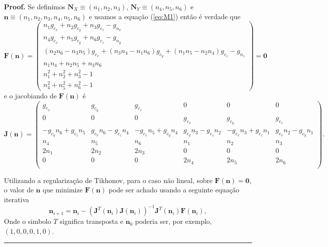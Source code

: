 \documentclass[a4paper,10pt]{report}
\newenvironment{proof}[1][Proof]{\textbf{#1.} }{\ \rule{0.5em}{0.5em}}
\begin{document}
\begin{proof}
Se definimos $\mathbf{N}_X \equiv (n_1,n_2,n_3)$, $\mathbf{N}_Y \equiv (n_4,n_5,n_6)$ e
$\mathbf{n} \equiv (n_1,n_2,n_3,n_4,n_5,n_6)$
e usamos a equação (\ref{eq:M1}) então é verdade que
\begin{equation}\label{eq:M2}
\mathbf{F}(\mathbf{n})=\left ( \begin{matrix}
n_1 g_{c_x} + n_2 g_{c_y} + n_3 g_{c_z} - g_{n_x} \\
n_4 g_{c_x} + n_5 g_{c_y} + n_6 g_{c_z} - g_{n_y} \\
(n_2 n_6 -n_3 n_5) g_{c_x} + (n_3 n_4 -n_1 n_6) g_{c_y} + (n_1 n_5 -n_2 n_4) g_{c_z} - g_{n_z} \\
n_1 n_4 + n_2 n_5 + n_3 n_6 \\
n_1^2 + n_2^2 +n_3^2 -1 \\
n_4^2 + n_5^2 +n_6^2 -1
\end{matrix}\right)=\mathbf{0} 
\end{equation}
e o jacobiando de $\mathbf{F}(\mathbf{n})$ é
\begin{equation}\label{eq:M3}
\mathbf{J}(\mathbf{n})=\left ( \begin{matrix}
g_{c_x} & g_{c_y} & g_{c_z} & 0      & 0       & 0  \\
0       & 0       & 0       & g_{c_x} & g_{c_y} & g_{c_z} \\
-g_{c_y} n_6 + g_{c_z} n_5  & g_{c_x} n_6 - g_{c_z} n_4 & -g_{c_x} n_5 + g_{c_y} n_4 & g_{c_y} n_3 - g_{c_z} n_2 & -g_{c_x} n_3 + g_{c_z} n_1 & g_{c_x} n_2 - g_{c_y} n_1 \\
n_4     & n_5     & n_6     & n_1    & n_2     & n_3 \\
2 n_1   & 2 n_2   & 2 n_3   & 0      & 0       & 0   \\
0       & 0       & 0       & 2 n_4  & 2 n_5   & 2 n_6   \\
\end{matrix}\right).
\end{equation}


Utilizando a regularização de Tikhonov, para o caso não lineal, sobre $\mathbf{F}(\mathbf{n})=\mathbf{0} $,
o valor de $\mathbf{n}$ que minimize $\mathbf{F}(\mathbf{n})$ pode ser achado usando
a seguinte equação iterativa
\begin{equation} \label{eq:Tikhonov}
 \mathbf{n}_{i+1}=\mathbf{n}_{i}- \left( \mathbf{J}^T(\mathbf{n}_{i}) \mathbf{J}(\mathbf{n}_{i})\right)^{-1} \mathbf{J}^T(\mathbf{n}_{i}) \mathbf{F}(\mathbf{n}_{i}),
\end{equation}
Onde o simbolo $T$ significa transposta e $\mathbf{n}_0$ poderia ser, por exemplo,
$( 1,0,0, 0,1,0 )$.
\end{proof}
\end{document}
